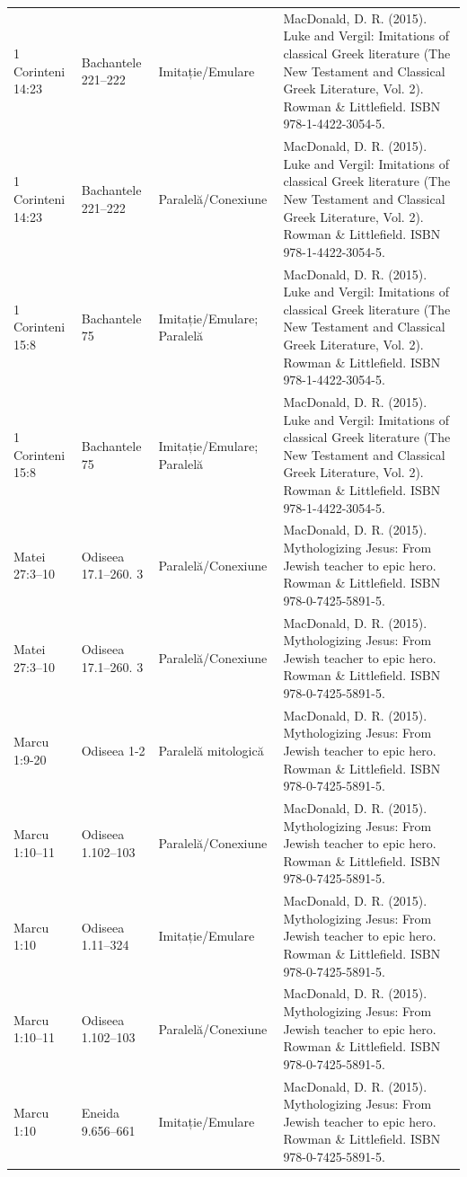 \documentclass[12pt,a4paper,twoside,openany]{book}
\begin{document}
\begin{longtable}{L{1.4cm}L{1.7cm}L{3.1cm}L{8.4cm}}
1 Corinteni 14:23 & Bachantele 221–222 & Imitație/Emulare & MacDonald, D. R. (2015). Luke and Vergil: Imitations of classical Greek literature (The New Testament and Classical Greek Literature, Vol. 2). Rowman \& Littlefield. ISBN 978-1-4422-3054-5. \\
1 Corinteni 14:23 & Bachantele 221–222 & Paralelă/Conexiune & MacDonald, D. R. (2015). Luke and Vergil: Imitations of classical Greek literature (The New Testament and Classical Greek Literature, Vol. 2). Rowman \& Littlefield. ISBN 978-1-4422-3054-5. \\
1 Corinteni 15:8 & Bachantele 75 & Imitație/Emulare; Paralelă & MacDonald, D. R. (2015). Luke and Vergil: Imitations of classical Greek literature (The New Testament and Classical Greek Literature, Vol. 2). Rowman \& Littlefield. ISBN 978-1-4422-3054-5. \\
1 Corinteni 15:8 & Bachantele 75 & Imitație/Emulare; Paralelă & MacDonald, D. R. (2015). Luke and Vergil: Imitations of classical Greek literature (The New Testament and Classical Greek Literature, Vol. 2). Rowman \& Littlefield. ISBN 978-1-4422-3054-5. \\
Matei 27:3–10 & Odiseea 17.1–260. 3 & Paralelă/Conexiune & MacDonald, D. R. (2015). Mythologizing Jesus: From Jewish teacher to epic hero. Rowman \& Littlefield. ISBN 978-0-7425-5891-5. \\
Matei 27:3–10 & Odiseea 17.1–260. 3 & Paralelă/Conexiune & MacDonald, D. R. (2015). Mythologizing Jesus: From Jewish teacher to epic hero. Rowman \& Littlefield. ISBN 978-0-7425-5891-5. \\
Marcu 1:9-20 & Odiseea 1-2 & Paralelă mitologică & MacDonald, D. R. (2015). Mythologizing Jesus: From Jewish teacher to epic hero. Rowman \& Littlefield. ISBN 978-0-7425-5891-5. \\
Marcu 1:10–11 & Odiseea 1.102–103 & Paralelă/Conexiune & MacDonald, D. R. (2015). Mythologizing Jesus: From Jewish teacher to epic hero. Rowman \& Littlefield. ISBN 978-0-7425-5891-5. \\
Marcu 1:10 & Odiseea 1.11–324 & Imitație/Emulare & MacDonald, D. R. (2015). Mythologizing Jesus: From Jewish teacher to epic hero. Rowman \& Littlefield. ISBN 978-0-7425-5891-5. \\
Marcu 1:10–11 & Odiseea 1.102–103 & Paralelă/Conexiune & MacDonald, D. R. (2015). Mythologizing Jesus: From Jewish teacher to epic hero. Rowman \& Littlefield. ISBN 978-0-7425-5891-5. \\
Marcu 1:10 & Eneida 9.656–661 & Imitație/Emulare & MacDonald, D. R. (2015). Mythologizing Jesus: From Jewish teacher to epic hero. Rowman \& Littlefield. ISBN 978-0-7425-5891-5. \\

\end{longtable}
\end{document}
